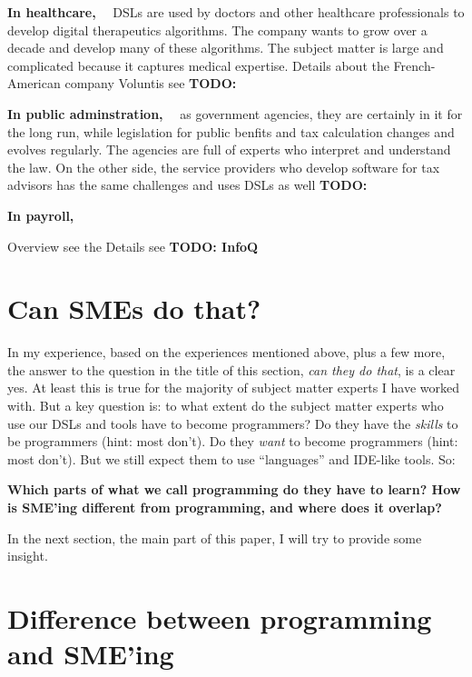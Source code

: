 \documentclass[runningheads]{llncs}
\newcommand\parhead[1]{\vspace{1mm}\noindent\textbf{{#1}}\ \ }
\newcommand\todo[1]{\vspace{1mm}\noindent\textbf{\color{red} {{TODO: {#1}} }}}
\begin{document}
\parhead{In healthcare,} DSLs are used by doctors and other healthcare
professionals to develop digital therapeutics algorithms. The company wants to
grow over a decade and develop many of these algorithms. The subject matter is
large and complicated because it captures medical expertise. Details about
the French-American company Voluntis see \todo{}

\parhead{In public adminstration,} as government agencies, they are certainly in
it for the long run, while legislation for public benfits and tax calculation
changes and evolves regularly. The agencies are full of experts who interpret
and understand the law. On the other side, the service providers who develop
software for tax advisors has the same challenges and uses DSLs as well \todo{}

\parhead{In payroll, }

\vspace{3mm}

\noindent Overview see the Details see \todo{InfoQ}

\section{Can SMEs do that?}

In my experience, based on the experiences mentioned above, plus a few more, the
answer to the question in the title of this section, \emph{can they do that}, is
a clear yes. At least this is true for the majority of subject matter experts I
have worked with. But a key question is: to what extent do the subject matter
experts who use our DSLs and tools have to become programmers? Do they have the
\emph{skills} to be programmers (hint: most don't). Do they \emph{want} to
become programmers (hint: most don't). But we still expect them to use
``languages'' and IDE-like tools. So:

\vspace{2mm}
\noindent \textbf{Which parts of what we call programming do they have to learn?
How is SME'ing different from programming, and where does it overlap?}
\vspace{2mm}

\noindent In the next section, the main part of this paper, I will try to provide some
insight.

\section{Difference between programming and SME'ing}
\end{document}
